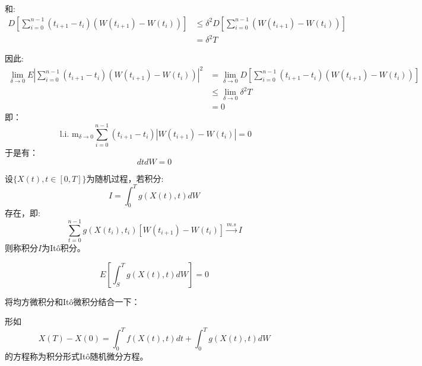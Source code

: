 和:
$$
\begin{aligned}
D\left[\sum_{i=0}^{n-1}\left(t_{i+1}-t_i\right)\left(W\left(t_{i+1}\right)-W\left(t_i\right)\right)\right] & \leq \delta^2 D\left[\sum_{i=0}^{n-1}\left(W\left(t_{i+1}\right)-W\left(t_i\right)\right)\right] \\
& =\delta^2 T
\end{aligned}
$$

因此:
$$
\begin{aligned}
\lim _{\delta \rightarrow 0} E\left|\sum_{i=0}^{n-1}\left(t_{i+1}-t_i\right)\left(W\left(t_{i+1}\right)-W\left(t_i\right)\right)\right|^2 & =\lim _{\delta \rightarrow 0} D\left[\sum_{i=0}^{n-1}\left(t_{i+1}-t_i\right)\left(W\left(t_{i+1}\right)-W\left(t_i\right)\right)\right] \\
& \leq \lim _{\delta \rightarrow 0} \delta^2 T \\
& =0
\end{aligned}
$$
即：
$$
\text { l.i. } \mathrm{m}_{\delta \rightarrow 0} \sum_{i=0}^{n-1}\left(t_{i+1}-t_i\right)\left|W\left(t_{i+1}\right)-W\left(t_i\right)\right|=0
$$
于是有：
\begin{equation}
  dt dW = 0
\end{equation}

\begin{definition}[Itô积分]
  设$\{X(t), t\in [0, T] \}$为随机过程，若积分:
  \begin{equation}
    I=\int_0^T g(X(t), t) d W
  \end{equation}
  存在，即:
$$
\sum_{t=0}^{n-1} g\left(X\left(t_i\right), t_i\right)\left[W\left(t_{i+1}\right)-W\left(t_i\right)\right] \xrightarrow{m . s} I
$$
则称积分$I$为Itô积分。
\end{definition}

\begin{property}
  \begin{equation}
    E\left[\int_S^T g(X(t), t) d W\right]=0
    \end{equation}
\end{property}

将均方微积分和Itô微积分结合一下：
\begin{definition}[Itô随机微分方程]
  形如
  \begin{equation}
    X(T)-X(0)=\int_0^T f(X(t), t) d t+\int_0^T g(X(t), t) d W
  \end{equation}
  的方程称为积分形式Itô随机微分方程。
\end{definition}

